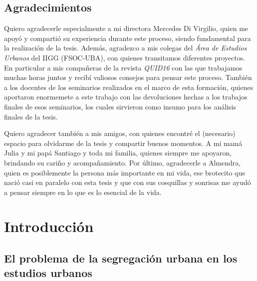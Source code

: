 \documentclass[
  spanish,
  a4paper,%
  chapterprefix=true,%
  DIV=calc,%
  twoside]{scrbook}%
\begin{document}
\section*{Agradecimientos}\label{agradecimientos}

Quiero agradecerle especialmente a mi directora Mercedes Di Virgilio, quien me apoyó y compartió su experiencia durante este proceso, siendo fundamental para la realización de la tesis. Además, agradezco a mis colegas del \emph{Área de Estudios Urbanos} del IIGG (FSOC-UBA), con quienes transitamos diferentes proyectos. En particular a mis compañeras de la revista \emph{QUID16} con las que trabajamos muchas horas juntos y recibí valiosos consejos para pensar este proceso. También a los docentes de los seminarios realizados en el marco de esta formación, quienes aportaron enormemete a este trabajo con las devoluciones hechas a los trabajos finales de esos seminarios, los cuales sirvieron como insumo para los análisis finales de la tesis.

Quiero agradecer también a mis amigos, con quienes encontré el (necesario) espacio para olvidarme de la tesis y compartir buenos momentos. A mi mamá Julia y mi papá Santiago y toda mi familia, quienes siempre me apoyaron, brindando su cariño y acompañamiento. Por último, agradecerle a Almendra, quien es posiblemente la persona más importante en mi vida, ese brotecito que nació casi en paralelo con esta tesis y que con sus cosquillas y sonrisas me ayudó a pensar siempre en lo que es lo esencial de la vida.

\renewcommand{\chaptermark}[1]{\markboth{\thechapter.\ #1}{}}

\chapter{Introducción}\label{intro}



\pagestyle{scrheadings}
\clearpairofpagestyles
{}
\rohead{\leftmark}
\ofoot{\pagemark}

\section{El problema de la segregación urbana en los estudios urbanos}\label{el-problema-de-la-segregaciuxf3n-urbana-en-los-estudios-urbanos}
\end{document}
